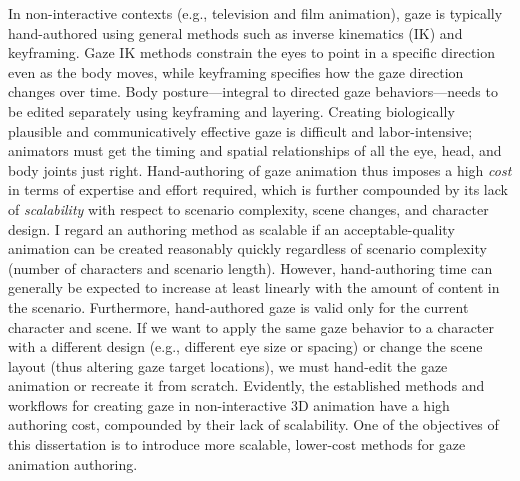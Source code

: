 In non-interactive contexts (e.g., television and film animation), gaze is typically hand-authored using general methods such as inverse kinematics (IK) and keyframing. Gaze IK methods constrain the eyes to point in a specific direction even as the body moves, while keyframing specifies how the gaze direction changes over time. Body posture---integral to directed gaze behaviors---needs to be edited separately using keyframing and layering. Creating biologically plausible and communicatively effective gaze is difficult and labor-intensive; animators must get the timing and spatial relationships of all the eye, head, and body joints just right. Hand-authoring of gaze animation thus imposes a high \emph{cost} in terms of expertise and effort required, which is further compounded by its lack of \emph{scalability} with respect to scenario complexity, scene changes, and character design. I regard an authoring method as scalable if an acceptable-quality animation can be created reasonably quickly regardless of scenario complexity (number of characters and scenario length). However, hand-authoring time can generally be expected to increase at least linearly with the amount of content in the scenario. Furthermore, hand-authored gaze is valid only for the current character and scene. If we want to apply the same gaze behavior to a character with a different design (e.g., different eye size or spacing) or change the scene layout (thus altering gaze target locations), we must hand-edit the gaze animation or recreate it from scratch. Evidently, the established methods and workflows for creating gaze in non-interactive 3D animation have a high authoring cost, compounded by their lack of scalability. One of the objectives of this dissertation is to introduce more scalable, lower-cost methods for gaze animation authoring.

